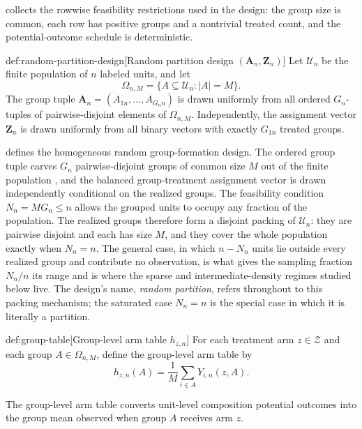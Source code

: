 \documentclass[11pt]{article}
\begin{document}
 collects the rowwise feasibility restrictions used in the design: the group size is common, each row has positive groups and a nontrivial treated count, and the potential-outcome schedule is deterministic.

\begin{definitionv}{def:random-partition-design}[Random partition design \((\mathbf A_n,\mathbf Z_n)\)]
Let \(\mathcal U_n\) be the finite population of \(n\) labeled units, and let
\[
\Omega_{n,M}=\{A\subseteq \mathcal U_n: |A|=M\}.
\]
The group tuple \(\mathbf A_n=(A_{1n},\ldots,A_{G_n n})\) is drawn uniformly from all ordered \(G_n\)-tuples of pairwise-disjoint elements of \(\Omega_{n,M}\). Independently, the assignment vector \(\mathbf Z_n\) is drawn uniformly from all binary vectors with exactly \(G_{1n}\) treated groups.
\end{definitionv}

 defines the homogeneous random group-formation design. The ordered group tuple  carves \(G_n\) pairwise-disjoint groups of common size \(M\) out of the finite population , and the balanced group-treatment assignment vector  is drawn independently conditional on the realized groups. The feasibility condition \(N_n=MG_n\le n\) allows the grouped units to occupy any fraction of the population. The realized groups therefore form a disjoint packing of \(\mathcal U_n\): they are pairwise disjoint and each has size \(M\), and they cover the whole population exactly when \(N_n=n\). The general case, in which \(n-N_n\) units lie outside every realized group and contribute no observation, is what gives the sampling fraction \(N_n/n\) its range and is where the sparse and intermediate-density regimes studied below live. The design's name, \emph{random partition}, refers throughout to this packing mechanism; the saturated case \(N_n=n\) is the special case in which it is literally a partition.

\begin{definitionv}{def:group-table}[Group-level arm table \(h_{z,n}\)]
For each treatment arm \(z\in\mathcal Z\) and each group \(A\in\Omega_{n,M}\), define the group-level arm table by
\[
h_{z,n}(A)=\frac{1}{M}\sum_{i\in A}Y_{i,n}(z,A).
\]
\end{definitionv}

The group-level arm table  converts unit-level composition potential outcomes into the group mean observed when group \(A\) receives arm \(z\).
\end{document}
